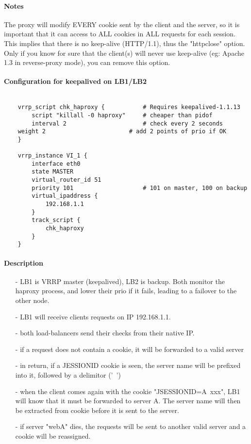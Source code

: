 \paragraph{Notes}

The proxy will modify EVERY cookie sent by the client and the server,
so it is important that it can access to ALL cookies in ALL requests for
each session. This implies that there is no keep-alive (HTTP/1.1), thus the
"httpclose" option. Only if you know for sure that the client(s) will never
use keep-alive (eg: Apache 1.3 in reverse-proxy mode), you can remove this
option.

\paragraph{Configuration for keepalived on LB1/LB2}

\begin{verbatim}

    vrrp_script chk_haproxy {           # Requires keepalived-1.1.13
        script "killall -0 haproxy"     # cheaper than pidof
        interval 2                      # check every 2 seconds
	weight 2                        # add 2 points of prio if OK
    }

    vrrp_instance VI_1 {
        interface eth0
        state MASTER
        virtual_router_id 51
        priority 101                    # 101 on master, 100 on backup
        virtual_ipaddress {
            192.168.1.1
        }
        track_script {
            chk_haproxy
        }
    }
\end{verbatim}

\paragraph{Description}

\begin{itemize}
\item[-] LB1 is VRRP master (keepalived), LB2 is backup. Both monitor the haproxy
   process, and lower their prio if it fails, leading to a failover to the
   other node.
\item[-] LB1 will receive clients requests on IP 192.168.1.1.
\item[-] both load-balancers send their checks from their native IP.
\item[-] if a request does not contain a cookie, it will be forwarded to a valid
   server
\item[-] in return, if a JESSIONID cookie is seen, the server name will be prefixed
   into it, followed by a delimitor ('~')
\item[-] when the client comes again with the cookie "JSESSIONID=A~xxx", LB1 will
   know that it must be forwarded to server A. The server name will then be
   extracted from cookie before it is sent to the server.
\item[-] if server "webA" dies, the requests will be sent to another valid server
   and a cookie will be reassigned.
\end{itemize}

